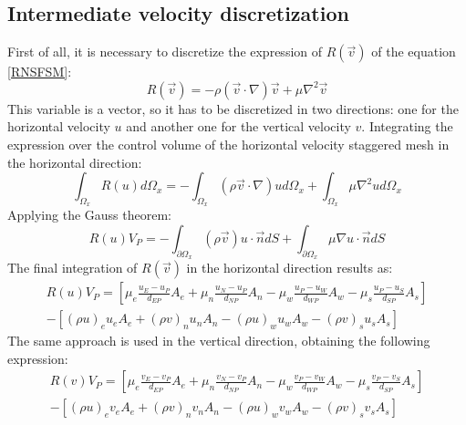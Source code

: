 \subsection{Intermediate velocity discretization}
First of all, it is necessary to discretize the expression of $R\left(\vec{v}\right)$ of the equation \ref{RNSFSM}:
\begin{equation}
R\left(\vec{v}\right)=-\rho\left(\vec{v}\cdot\nabla\right)\vec{v}+\mu\nabla^{2}\vec{v}
\end{equation}
This variable is a vector, so it has to be discretized in two directions: one for the horizontal velocity $u$ and another one for the vertical velocity $v$. Integrating the expression over the control volume of the horizontal velocity staggered mesh in the horizontal direction:
\begin{equation}
\int_{\Omega_{x}}R\left(u\right)d\Omega_{x}=-\int_{\Omega_{x}}\left(\rho\vec{v}\cdot\nabla\right)ud\Omega_{x}+\int_{\Omega_{x}}\mu\nabla^{2}ud\Omega_{x}
\end{equation}
Applying the Gauss theorem:
\begin{equation}
R\left(u\right)V_{P}=-\int_{\partial\Omega_{x}}\left(\rho\vec{v}\right)u\cdot\vec{n}dS+\int_{\partial\Omega_{x}}\mu\nabla u\cdot\vec{n}dS
\end{equation}
The final integration of $R\left(\vec{v}\right)$ in the horizontal direction results as:
\begin{multline}
R\left(u\right)V_{P}=\left[\mu_{e}\frac{u_{E}-u_{P}}{d_{EP}}A_{e}+\mu_{n}\frac{u_{N}-u_{P}}{d_{NP}}A_{n}-\mu_{w}\frac{u_{P}-u_{W}}{d_{WP}}A_{w}-\mu_{s}\frac{u_{P}-u_{S}}{d_{SP}}A_{s}\right] \\
-\left[\left(\rho u\right)_{e}u_{e}A_{e}+\left(\rho v\right)_{n}u_{n}A_{n}-\left(\rho u\right)_{w}u_{w}A_{w}-\left(\rho v\right)_{s}u_{s}A_{s}\right]
\end{multline}
The same approach is used in the vertical direction, obtaining the following expression:
\begin{multline}
	R\left(v\right)V_{P}=\left[\mu_{e}\frac{v_{E}-v_{P}}{d_{EP}}A_{e}+\mu_{n}\frac{v_{N}-v_{P}}{d_{NP}}A_{n}-\mu_{w}\frac{v_{P}-v_{W}}{d_{WP}}A_{w}-\mu_{s}\frac{v_{P}-v_{S}}{d_{SP}}A_{s}\right] \\
	-\left[\left(\rho u\right)_{e}v_{e}A_{e}+\left(\rho v\right)_{n}v_{n}A_{n}-\left(\rho u\right)_{w}v_{w}A_{w}-\left(\rho v\right)_{s}v_{s}A_{s}\right]
\end{multline}

